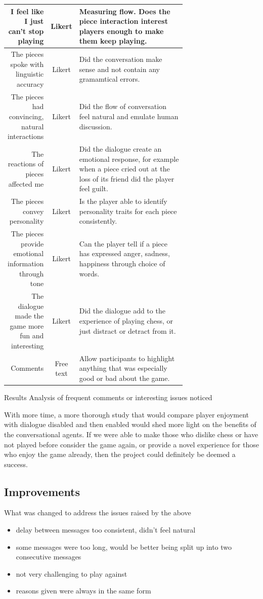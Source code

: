 \documentclass{article}
\begin{document}
\begin{table}[!ht]
{{\begin{tabular}{ r|c|p{0.7\linewidth} }
\hline
		I feel like I just can't stop playing & Likert & Measuring flow. Does the piece interaction interest players enough to make them keep playing. \\
\hline
		The pieces spoke with linguistic accuracy & Likert & Did the conversation make sense and not contain any gramamtical errors. \\
\hline
		The pieces had convincing, natural interactions & Likert & Did the flow of conversation feel natural and emulate human discussion.  \\
\hline
		The reactions of pieces affected me & Likert & Did the dialogue create an emotional response, for example when a piece cried out at the loss of its friend did the player feel guilt. \\
\hline
		The pieces convey personality & Likert & Is the player able to identify personality traits for each piece consistently. \\
\hline
		The pieces provide emotional information through tone & Likert & Can the player tell if a piece has expressed anger, sadness, happiness through choice of words. \\
\hline
		The dialogue made the game more fun and interesting & Likert & Did the dialogue add to the experience of playing chess, or just distract or detract from it. \\
\hline
		Comments & Free text & Allow participants to highlight anything that was especially good or bad about the game. \\
 \hline
\end{tabular}}}
\end{table}



Results
Analysis of frequent comments or interesting issues noticed

With more time, a more thorough study that would compare player enjoyment with dialogue disabled and then enabled would shed more light on the benefits of the conversational agents. If we were able to make those who dislike chess or have not played before consider the game again, or provide a novel experience for those who enjoy the game already, then the project could definitely be deemed a success.

\subsection{Improvements}

What was changed to address the issues raised by the above
\begin{itemize}
	\item delay between messages too consistent, didn't feel natural
	\item some messages were too long, would be better being split up into two consecutive messages
	\item not very challenging to play against
	\item reasons given were always in the same form 
\end{itemize}
\end{document}

